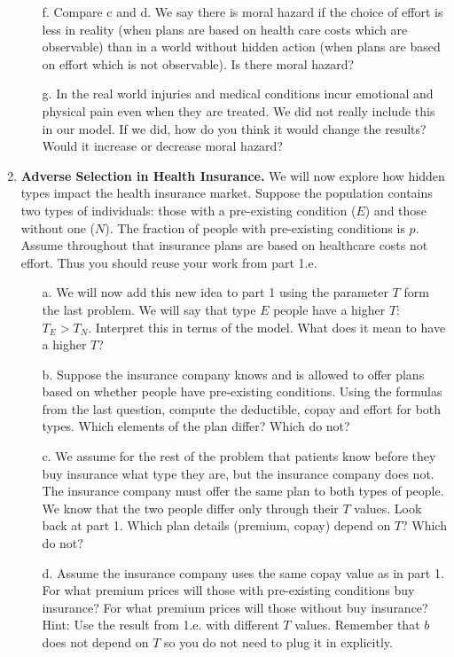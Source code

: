 \documentclass{article}
\begin{document}
\begin{enumerate}
\begin{enumerate}
        \item[f.] Compare c and d. We say there is moral hazard if the choice of effort is less in reality (when plans are based on health care costs which are observable) than in a world without hidden action (when plans are based on effort which is not observable). Is there moral hazard?
        
        \item[g.] In the real world injuries and medical conditions incur emotional and physical pain even when they are treated. We did not really include this in our model. If we did, how do you think it would change the results? Would it increase or decrease moral hazard?
    \end{enumerate}
    
    \item \textbf{Adverse Selection in Health Insurance.} We will now explore how hidden types impact the health insurance market. Suppose the population contains two types of individuals: those with a pre-existing condition ($E$) and those without one ($N$). The fraction of people with pre-existing conditions is $p$. Assume throughout that insurance plans are based on healthcare costs not effort. Thus you should reuse your work from part 1.e.
    
    \begin{enumerate}
        \item[a.]  We will now add this new idea to part 1 using the parameter $T$ form the last problem. We will say that type $E$ people have a higher $T$: $T_E>T_N$. Interpret this in terms of the model. What does it mean to have a higher $T$?
        
         \item[b.] Suppose the insurance company knows and is allowed to offer plans based on whether people have pre-existing conditions. Using the formulas from the last question, compute the deductible, copay and effort for both types. Which elements of the plan differ? Which do not?
         
         
        \item[c.] We assume for the rest of the problem that patients know before they buy insurance what type they are, but the insurance company does not. The insurance company must offer the same plan to both types of people. We know that the two people differ only through their $T$ values. Look back at part 1. Which plan details (premium, copay) depend on $T$? Which do not?
        
        \item[d.] Assume the insurance company uses the same copay value as in part 1. For what premium prices will those with pre-existing conditions buy insurance? For what premium prices will those without buy insurance? Hint: Use the result from 1.e. with different $T$ values. Remember that $b$ does not depend on $T$ so you do not need to plug it in explicitly.
        

\end{enumerate}
\end{enumerate}
\end{document}
